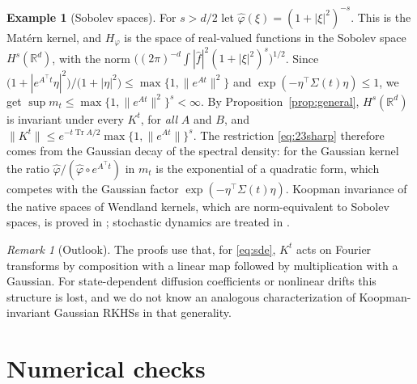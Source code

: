 \documentclass[11pt]{amsart}
\numberwithin{equation}{section}
\theoremstyle{definition}
\newtheorem{example}[theorem]{Example}
\theoremstyle{remark}
\newtheorem{remark}[theorem]{Remark}
\newcommand{\R}{\mathbb{R}}
\newcommand{\Tr}{\operatorname{Tr}}
\newcommand{\hatf}[1]{\widehat{#1}}
\newcommand{\tp}{\top}
\begin{document}
\begin{example}[Sobolev spaces]\label{ex:sobolev}
For $s>d/2$ let $\hatf\varphi(\xi)=(1+|\xi|^2)^{-s}$. This is the Mat\'ern kernel, and $H_\varphi$ is the space of
real-valued functions in the Sobolev space $H^s(\R^d)$, with the norm
$\bigl((2\pi)^{-d}\int|\hatf f|^2(1+|\xi|^2)^s\bigr)^{1/2}$. Since
$\bigl(1+|e^{A^\tp t}\eta|^2\bigr)/\bigl(1+|\eta|^2\bigr)\le\max\{1,\|e^{At}\|^2\}$ and
$\exp(-\eta^\tp\Sigma(t)\eta)\le1$, we get $\sup m_t\le\max\{1,\|e^{At}\|^2\}^s<\infty$. By
Proposition~\ref{prop:general}, $H^s(\R^d)$ is invariant under every $K^t$, for \emph{all} $A$ and $B$, and
$\|K^t\|\le e^{-t\Tr A/2}\max\{1,\|e^{At}\|\}^{s}$. The restriction \eqref{eq:23sharp} therefore comes from the
Gaussian decay of the spectral density: for the Gaussian kernel the ratio $\hatf\varphi/(\hatf\varphi\circ e^{A^\tp t})$
in $m_t$ is the exponential of a quadratic form, which competes with the Gaussian factor
$\exp(-\eta^\tp\Sigma(t)\eta)$. Koopman invariance of the native spaces of Wendland kernels, which are norm-equivalent to
Sobolev spaces, is proved in \cite{Koehne}; stochastic dynamics are treated in \cite{Hertel}.
\end{example}

\begin{remark}[Outlook]
The proofs use that, for \eqref{eq:sde}, $K^t$ acts on Fourier transforms by composition with a linear map followed by
multiplication with a Gaussian.
For state-dependent diffusion coefficients or nonlinear drifts this structure is lost, and we do not know an
analogous characterization of Koopman-invariant Gaussian RKHSs in that generality.
\end{remark}

\appendix

\section{Numerical checks}\label{app:numerics}
\end{document}
